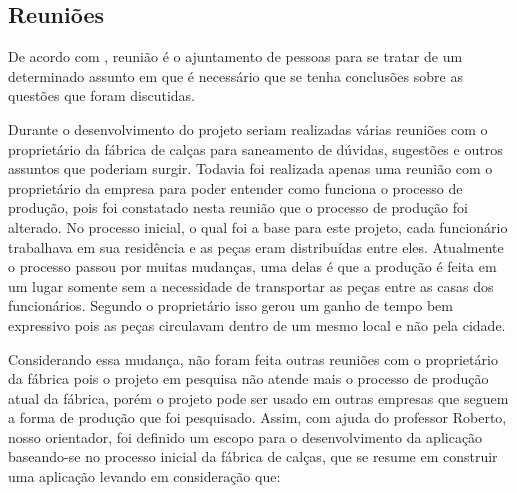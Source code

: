 \subsection{Reuniões}
\par De acordo com , reunião é o ajuntamento de
pessoas para se tratar de um determinado assunto em que é necessário que se
tenha conclusões sobre as questões que foram discutidas.

\par Durante o desenvolvimento do projeto seriam realizadas várias reuniões
com o proprietário da fábrica de calças para saneamento de dúvidas, sugestões e
outros assuntos que poderiam surgir. Todavia foi realizada apenas uma reunião com o proprietário
da empresa para poder entender como funciona o processo de produção, pois foi constatado nesta reunião que o
processo de produção foi alterado. No processo inicial, o qual foi a base para este projeto, cada funcionário trabalhava em
sua residência e as peças eram distribuídas entre eles. Atualmente o processo
passou por muitas mudanças, uma delas é que a produção é feita em um lugar
somente sem a necessidade de transportar as peças entre as casas dos
funcionários. Segundo o proprietário isso gerou um ganho de tempo bem expressivo
pois as peças circulavam dentro de um mesmo local e não pela cidade. 

\par Considerando essa mudança, não foram feita outras reuniões com o proprietário da fábrica
pois o projeto em pesquisa não atende mais o processo de produção atual da fábrica, porém o
projeto pode ser usado em outras empresas que seguem a forma de produção que foi
pesquisado. Assim, com ajuda do professor Roberto, nosso orientador, foi definido 
um escopo para o desenvolvimento da aplicação baseando-se no processo inicial da
fábrica de calças, que se resume em construir uma aplicação levando em consideração que:

